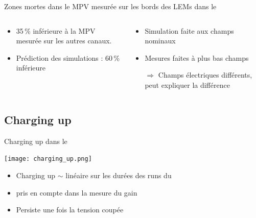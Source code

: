 \begin{frame}{Zones mortes dans le \TOO{}}{MPV mesurée sur les bords des LEMs dans le \TOO{}}
\begin{scriptsize}
\begin{columns}
\begin{column}{0.5\textwidth}
                \end{column}
            \end{columns}
            \begin{columns}
                \begin{column}{0.5\textwidth}
                    \begin{itemize}
                        \item 35\,\% inférieure à la MPV mesurée sur les autres canaux.
                        \item Prédiction des simulations : 60\,\% inférieure
                    \end{itemize}
                \end{column}
                \begin{column}{0.5\textwidth}
                    \begin{itemize}
                        \item Simulation faite aux champs nominaux
                        \item Mesures faites à plus bas champs
                        \item[$\Rightarrow$] Champs électriques différents, peut expliquer la différence 
                    \end{itemize}
                \end{column}
            \end{columns}
        \end{scriptsize}
    \end{frame}

    \subsection{Charging up}
    \begin{frame}{Charging up dans le \TOO{}}
        \begin{scriptsize}
            \texttt{[image: charging\_up.png]}
            \begin{itemize}
                \item Charging up $\sim$ linéaire sur les durées des runs du \TOO{}
                \item pris en compte dans la mesure du gain
                \item Persiste une fois la tension coupée
            \end{itemize}
        \end{scriptsize}
    \end{frame}
    

